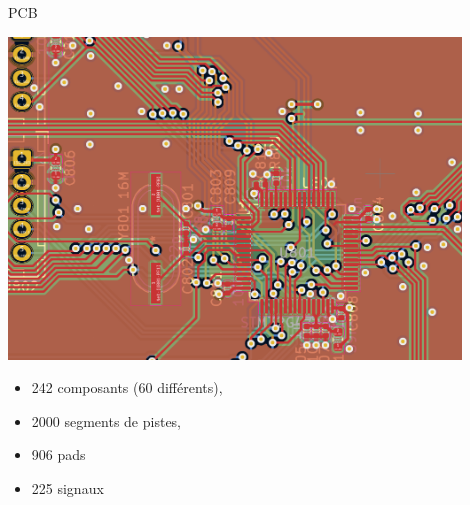\documentclass[aspectratio=169]{beamer}
\begin{document}
\begin{frame}{PCB}
\begin{minipage}{0.49\textwidth}
\begin{center}
	\includegraphics[width=0.9\textwidth]{figures/pcb.png} 
\end{center}
\end{minipage}
\begin{minipage}{0.49\textwidth}
\begin{itemize}
	\item 242 composants (60 différents),
	\item 2000 segments de pistes,
	\item 906 pads
	\item 225 signaux
\end{itemize}
\end{minipage}
\end{frame}
\end{document}
